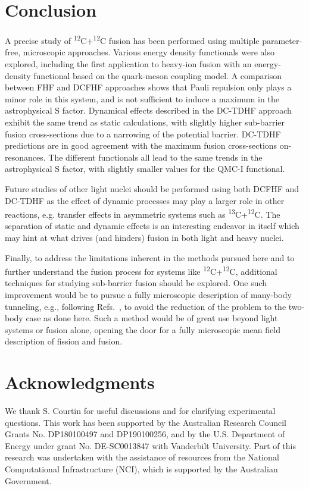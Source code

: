 \section{Conclusion}
\label{sec:conclusion}
A precise study of \textsuperscript{12}C+\textsuperscript{12}C fusion has been performed using multiple parameter-free, microscopic approaches. 
Various energy density functionals were also explored, including the first application to heavy-ion fusion with an energy-density functional based on the quark-meson coupling model.
A comparison between FHF and DCFHF approaches shows that Pauli repulsion only plays a minor role in this system, and is not sufficient to induce a maximum in the astrophysical S factor. 
Dynamical effects described in the DC-TDHF approach exhibit the same trend as static calculations, with slightly higher sub-barrier fusion cross-sections due to a narrowing of the potential barrier. 
DC-TDHF predictions are in good agreement with the maximum fusion cross-sections on-resonances. 
The different functionals all lead to the same trends in the astrophysical S factor, with slightly smaller values for the QMC-I functional. 

Future studies of other light nuclei should be performed using both DCFHF and DC-TDHF as the effect of dynamic processes may play a larger role in other reactions, e.g. transfer effects in asymmetric systems such as \textsuperscript{13}C+\textsuperscript{12}C. 
The separation of static and dynamic effects is an interesting endeavor in itself which may hint at what drives (and hinders) fusion in both light and heavy nuclei.

Finally, to address the limitations inherent in the methods pursued here and to further understand the fusion process for systems like \textsuperscript{12}C+\textsuperscript{12}C, additional techniques for studying sub-barrier fusion should be explored.
One such improvement would be to pursue a fully microscopic description of many-body tunneling, e.g., following Refs.~\protect\citep{levit1980c,reinhardt1980}, 
to avoid the reduction of the problem to the two-body case as done here.
Such a method would be of great use beyond light systems or fusion alone, opening the door for a fully microscopic mean field description of fission and fusion.



\section*{Acknowledgments}
We thank S. Courtin for useful discussions and for clarifying experimental questions. 
This work has been supported by the
Australian Research Council Grants No. DP180100497 and DP190100256,
and by the U.S. Department of Energy under grant No.
DE-SC0013847 with Vanderbilt University.
Part of this research was undertaken with the assistance of resources
from the National Computational Infrastructure (NCI), which is supported by the Australian Government.

\clearpage

